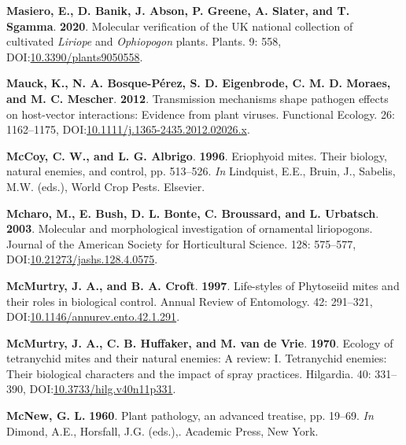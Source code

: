 \documentclass[12pt,final,CPage]{ufthesis}
\newlength{\cslhangindent}
\newenvironment{CSLReferences}[2] %
{%
	\setlength{\parindent}{0pt}
	\ifodd #1 \everypar{\setlength{\hangindent}{\cslhangindent}}\ignorespaces\fi
	\ifnum #2 > 0
	\setlength{\parskip}{#2\baselineskip}
	\fi
}%
{}
\begin{document}
{\begin{CSLReferences}{1}{0}
  \leavevmode{}%
  \textbf{Masiero, E., D. Banik, J. Abson, P. Greene, A. Slater, and T. Sgamma}. \textbf{2020}. Molecular verification of the {UK} national collection of cultivated {\emph{Liriope}} and {\emph{Ophiopogon}} plants. Plants. 9: 558, DOI:\href{https://doi.org/10.3390/plants9050558}{10.3390/plants9050558}.

  \leavevmode{}%
  \textbf{Mauck, K., N. A. Bosque-Pérez, S. D. Eigenbrode, C. M. D. Moraes, and M. C. Mescher}. \textbf{2012}. Transmission mechanisms shape pathogen effects on host-vector interactions: Evidence from plant viruses. Functional Ecology. 26: 1162--1175, DOI:\href{https://doi.org/10.1111/j.1365-2435.2012.02026.x}{10.1111/j.1365-2435.2012.02026.x}.

  \leavevmode{}%
  \textbf{McCoy, C. W., and L. G. Albrigo}. \textbf{1996}. Eriophyoid mites. Their biology, natural enemies, and control, pp. 513--526. \emph{In} Lindquist, E.E., Bruin, J., Sabelis, M.W. (eds.), World Crop Pests. Elsevier.

  \leavevmode{}%
  \textbf{Mcharo, M., E. Bush, D. L. Bonte, C. Broussard, and L. Urbatsch}. \textbf{2003}. Molecular and morphological investigation of ornamental liriopogons. Journal of the American Society for Horticultural Science. 128: 575--577, DOI:\href{https://doi.org/10.21273/jashs.128.4.0575}{10.21273/jashs.128.4.0575}.

  \leavevmode{}%
  \textbf{McMurtry, J. A., and B. A. Croft}. \textbf{1997}. Life-styles of {Phytoseiid} mites and their roles in biological control. Annual Review of Entomology. 42: 291--321, DOI:\href{https://doi.org/10.1146/annurev.ento.42.1.291}{10.1146/annurev.ento.42.1.291}.

  \leavevmode{}%
  \textbf{McMurtry, J. A., C. B. Huffaker, and M. van de Vrie}. \textbf{1970}. Ecology of tetranychid mites and their natural enemies: A review: I. Tetranychid enemies: Their biological characters and the impact of spray practices. Hilgardia. 40: 331--390, DOI:\href{https://doi.org/10.3733/hilg.v40n11p331}{10.3733/hilg.v40n11p331}.

  \leavevmode{}%
  \textbf{McNew, G. L.} \textbf{1960}. Plant pathology, an advanced treatise, pp. 19--69. \emph{In} Dimond, A.E., Horsfall, J.G. (eds.),. Academic Press, New York.


\end{CSLReferences}}
\end{document}
